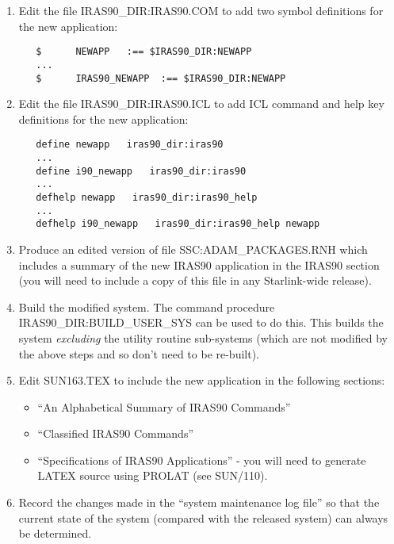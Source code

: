 \begin{enumerate}
\item Edit the file {\small IRAS90\_DIR:IRAS90.COM} to add two symbol 
definitions for the new application:

\small
\begin{verbatim}
   $      NEWAPP   :== $IRAS90_DIR:NEWAPP
   ...
   $      IRAS90_NEWAPP  :== $IRAS90_DIR:NEWAPP
\end{verbatim}
\normalsize

\item Edit the file {\small IRAS90\_DIR:IRAS90.ICL} to add {\small ICL}
command and help key definitions for the new application:

\small
\begin{verbatim}
   define newapp   iras90_dir:iras90
   ...
   define i90_newapp   iras90_dir:iras90
   ...
   defhelp newapp   iras90_dir:iras90_help
   ...
   defhelp i90_newapp   iras90_dir:iras90_help newapp
\end{verbatim}
\normalsize

\item Produce an edited version of file {\small SSC:ADAM\_PACKAGES.RNH} which 
includes a summary of the new {\small IRAS90} application in the {\small IRAS90} 
section (you will need to include a copy of this file in any Starlink-wide 
release).

\item Build the modified system. The command procedure {\small
IRAS90\_DIR:BUILD\_USER\_SYS} can be used to do this. This builds the system
{\em excluding} the utility routine sub-systems (which are not modified by the
above steps and so don't need to be re-built). 

\item Edit {\small SUN163.TEX} to include the new application in the following 
sections:
\begin{itemize}
\item ``An Alphabetical Summary of {\small IRAS90} Commands''
\item ``Classified {\small IRAS90} Commands''
\item ``Specifications of {\small IRAS90} Applications'' - you will need to 
generate {\small LATEX} source using {\small PROLAT} (see SUN/110).
\end{itemize}

\item Record the changes made in the ``system maintenance log file'' so that the
current state of the system (compared with the released system) can 
always be determined.

\end{enumerate}

